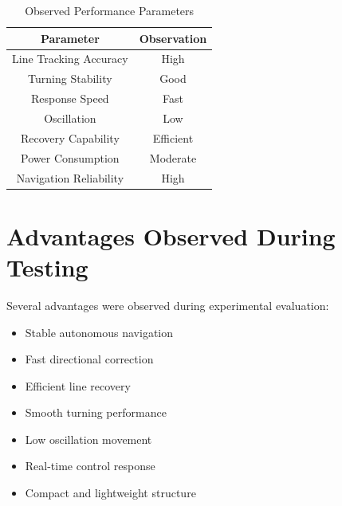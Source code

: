 \documentclass[12pt,a4paper,oneside]{report}
\begin{document}
\begin{table}[H]
\centering
\caption{Observed Performance Parameters}

\begin{tabular}{|c|c|}
\hline

\textbf{Parameter} &
\textbf{Observation} \\

\hline

Line Tracking Accuracy & High \\

Turning Stability & Good \\

Response Speed & Fast \\

Oscillation & Low \\

Recovery Capability & Efficient \\

Power Consumption & Moderate \\

Navigation Reliability & High \\

\hline

\end{tabular}

\end{table}


\section{Advantages Observed During Testing}

Several advantages were observed during experimental evaluation:

\begin{itemize}

\item Stable autonomous navigation

\item Fast directional correction

\item Efficient line recovery

\item Smooth turning performance

\item Low oscillation movement

\item Real-time control response

\item Compact and lightweight structure

\end{itemize}
\end{document}
